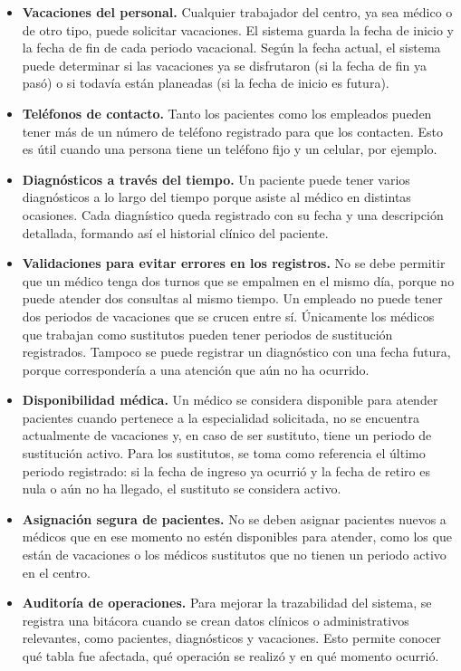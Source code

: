\documentclass[12pt,a4paper]{article}
\begin{document}
\begin{itemize}
    \item \textbf{Vacaciones del personal.} Cualquier trabajador del centro, ya sea m\'edico o de otro tipo, puede solicitar vacaciones. El sistema guarda la fecha de inicio y la fecha de fin de cada periodo vacacional. Seg\'un la fecha actual, el sistema puede determinar si las vacaciones ya se disfrutaron (si la fecha de fin ya pas\'o) o si todav\'ia est\'an planeadas (si la fecha de inicio es futura).

    \item \textbf{Tel\'efonos de contacto.} Tanto los pacientes como los empleados pueden tener m\'as de un n\'umero de tel\'efono registrado para que los contacten. Esto es \'util cuando una persona tiene un tel\'efono fijo y un celular, por ejemplo.

    \item \textbf{Diagn\'osticos a trav\'es del tiempo.} Un paciente puede tener varios diagn\'osticos a lo largo del tiempo porque asiste al m\'edico en distintas ocasiones. Cada diagn\'istico queda registrado con su fecha y una descripci\'on detallada, formando as\'i el historial cl\'inico del paciente.

\item \textbf{Validaciones para evitar errores en los registros.} No se debe permitir que un m\'edico tenga dos turnos que se empalmen en el mismo d\'ia, porque no puede atender dos consultas al mismo tiempo. Un empleado no puede tener dos periodos de vacaciones que se crucen entre s\'i. \'Unicamente los m\'edicos que trabajan como sustitutos pueden tener periodos de sustituci\'on registrados. Tampoco se puede registrar un diagn\'ostico con una fecha futura, porque corresponder\'ia a una atenci\'on que a\'un no ha ocurrido.

\item \textbf{Disponibilidad m\'edica.} Un m\'edico se considera disponible para atender pacientes cuando pertenece a la especialidad solicitada, no se encuentra actualmente de vacaciones y, en caso de ser sustituto, tiene un periodo de sustituci\'on activo. Para los sustitutos, se toma como referencia el \'ultimo periodo registrado: si la fecha de ingreso ya ocurri\'o y la fecha de retiro es nula o a\'un no ha llegado, el sustituto se considera activo.

\item \textbf{Asignaci\'on segura de pacientes.} No se deben asignar pacientes nuevos a m\'edicos que en ese momento no est\'en disponibles para atender, como los que est\'an de vacaciones o los m\'edicos sustitutos que no tienen un periodo activo en el centro.

\item \textbf{Auditor\'ia de operaciones.} Para mejorar la trazabilidad del sistema, se registra una bit\'acora cuando se crean datos cl\'inicos o administrativos relevantes, como pacientes, diagn\'osticos y vacaciones. Esto permite conocer qu\'e tabla fue afectada, qu\'e operaci\'on se realiz\'o y en qu\'e momento ocurri\'o.

\end{itemize}
\end{document}

